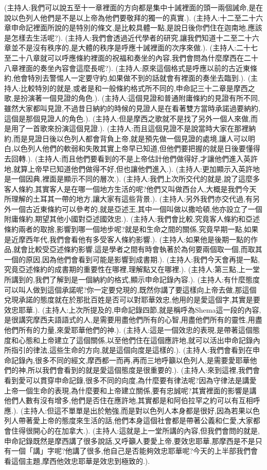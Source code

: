 \documentclass{book}
\begin{document}
(主持人:我們可以說五至十一章裡面的方向都是集中十誡裡面的頭一兩個誡命,是在說以色列人他們是不是以上帝為他們要敬拜的獨一的真實.).
(主持人:十二至二十六章申命記裡面所說的是特別的條文,是比較具體一點,是說日後你們住在迦南地,應該是怎樣去生活呢?).
(主持人:我們會透過近代學者的研究,讓我們知道十二至二十六章並不是沒有秩序的,是大體的秩序是呼應十誡裡面的次序來做.).
(主持人:二十七至二十八章就可以呼應條約裡面的祝福和奏坐的內容,我們會問為什麼摩西在二十八章裡面的奏坐內容會這麼長呢?).
(主持人:原來這個格式是呼應以前的古近東條約,他會特別去警惕人一定要守約,如果做不到的話就會有裡面的奏坐去臨到.).
(主持人:比較特別的就是,或者是和一般條約格式所不同的,申命記三十二章是摩西之歌,是扮演著一個見證的角色.).
(主持人:這個見證和普通附庸條約的見證有所不同,雖然大家都叫見證,不過昔日納約的時候的見證人是在看著雙方當時承諾過要納約,這個是那個見證人的角色.).
(主持人:但是摩西之歌就不是找了另外一個人來做,而是用了一首歌來扮演這個見證.).
(主持人:而且這個見證不是說當時大家在那裡納約,而是見證日後以色列人都會背負上帝,就是預先做一個見證的處境,讓人可以明白,以色列人他們的軟弱和失敗其實上帝早已知道,但他們要把握的就是日後要懂得去回轉.).
(主持人:而且他們要看到的不是上帝估計他們做得好,才讓他們進入英許地,就算上帝早已知道他們做得不好,但也讓他們進入.).
(主持人:更加顯示入英許地是一個因典,裡面是顯示不同的層次.).
(主持人:我們上次所交代的就是,說了這麼多客人條約,其實客人是在哪一個地方生活的呢?他們又叫做西台人,大概是我們今天所理解的土耳其一帶的地方,讓大家有這些背景.).
(主持人:另外我們亦交代過,有另外一個古近東條約可以參考的,就是亞述王,其中一個叫做以撒哈頓,他亦設立了一個附庸條約,期望其他小國對亞述國效忠.).
(主持人:我們會比較,究竟客人條約和亞述條約兩者的取捨,影響到哪一個地步呢?就是和生命之間的關係,究竟早期一點,如果是近摩西年代,我們會看他有多受客人條約影響.).
(主持人:如果他是後期一點的作品,就會比較受亞述條約影響,這是學者之間有時會執著於為何要兩個取一個,而取其一個的原因,因為他們會看到可能是影響到成書期.).
(主持人:我們今天會再提一點,究竟亞述條約的成書期的重要性在哪裡,理解點又在哪裡.).
(主持人:第三點,上一堂所講到的,我們了解到是一個納約的格式,顯示申命記錄內容.).
(主持人:有什麼態度可以叫人做到這個承諾呢?你一定要兌現的,既然你講了要這樣向上帝去做,那這個兌現承諾的態度就在於那批百姓是否可以對耶華效忠,他用的是愛這個字,其實是要效忠耶華.).
(主持人:上次所提及的,申命記錄四節,就是稱呼為Shema這一段的內容,是很講究摩西夫語語式的人,是需要用盡他們所有的心智,用盡他們所有的靈性,用盡他們所有的力量,來愛耶華他們的神.).
(主持人:這是一個效忠的表現,是帶著這個態度和心態和上帝建立了這個關係,以至他們住在這個應許地,就可以活出申命記錄內所指引的律法,這些生命的方向,就是這個向度是這樣的.).
(主持人:我們會看到在申命記錄內,很多不同的經文,摩西都一而再,再而三地呼籲以色列人,是需要愛耶華他們的神,所以我們會看到的就是愛這個態度是很重要的.).
(主持人:來到這裡,我們會看到愛可以貫穿申命記錄,很多不同的向度,為什麼要有律法呢?因為守律法是講愛上帝一個生命的表現,為什麼要和上帝建立關係,要有忠誠呢?其實裡面的影響是講他們人數有沒有增多,他們是否住在應許地,其實都是和阿伯拉罕之約可以有互相呼應.).
(主持人:但這不單單是出於勉強,而是對以色列人本身都是很好,因為若果以色列人帶著愛上帝的態度來生活的話,他們本身這個社會都是帶著公義和仁愛,大家都會住得很開心的在加拿大.).
(主持人:這就是上一堂所講的內容,但我們會問的就是,申命記錄既然是摩西講了很多說話,又呼籲人要愛上帝,要效忠耶華,那摩西是不是只有一個「講」字呢?他講了很多,他自己是否能夠效忠耶華呢?今天的上半部我們會看這個主題,摩西他效忠耶華是效忠到極致的.).
\end{document}
